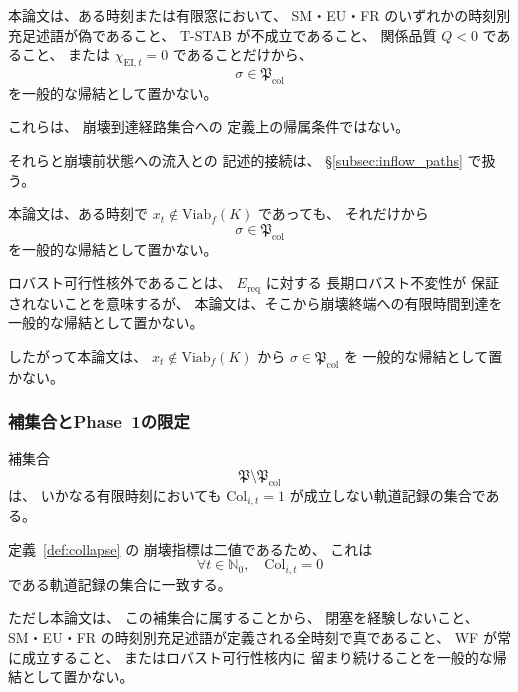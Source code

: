 \begin{remark}
\label{rem:principles_not_col_path}
本論文は、ある時刻または有限窓において、
SM・EU・FR のいずれかの時刻別充足述語が偽であること、
T-STAB が不成立であること、
関係品質
$Q<0$
であること、
または
$\chi_{\mathrm{EI},t}=0$
であることだけから、
\[
  \sigma\in\mathfrak{P}_{\mathrm{col}}
\]
を一般的な帰結として置かない。

これらは、
崩壊到達経路集合への
定義上の帰属条件ではない。

それらと崩壊前状態への流入との
記述的接続は、
\S\ref{subsec:inflow_paths}
で扱う。
\end{remark}

\begin{remark}[ロバスト可行性核外と崩壊到達の関係]
\label{rem:viab_outside_not_col_path}
本論文は、ある時刻で
$x_t\notin\mathrm{Viab}_f(K)$
であっても、
それだけから
\[
  \sigma\in\mathfrak{P}_{\mathrm{col}}
\]
を一般的な帰結として置かない。

ロバスト可行性核外であることは、
$E_{\mathrm{req}}$ に対する
長期ロバスト不変性が
保証されないことを意味するが、
本論文は、そこから崩壊終端への有限時間到達を
一般的な帰結として置かない。

したがって本論文は、
$x_t\notin\mathrm{Viab}_f(K)$ から
$\sigma\in\mathfrak{P}_{\mathrm{col}}$ を
一般的な帰結として置かない。
\end{remark}

\subsubsection{補集合とPhase~1の限定}

\begin{remark}
\label{rem:col_avoidance}
補集合
\[
  \mathfrak{P}
  \setminus
  \mathfrak{P}_{\mathrm{col}}
\]
は、
いかなる有限時刻においても
$\mathrm{Col}_{i,t}=1$
が成立しない軌道記録の集合である。

定義~\ref{def:collapse} の
崩壊指標は二値であるため、
これは
\[
  \forall t\in\mathbb{N}_0,
  \quad
  \mathrm{Col}_{i,t}=0
\]
である軌道記録の集合に一致する。

ただし本論文は、
この補集合に属することから、
閉塞を経験しないこと、
SM・EU・FR の時刻別充足述語が定義される全時刻で真であること、
WF が常に成立すること、
またはロバスト可行性核内に
留まり続けることを一般的な帰結として置かない。
\end{remark}

